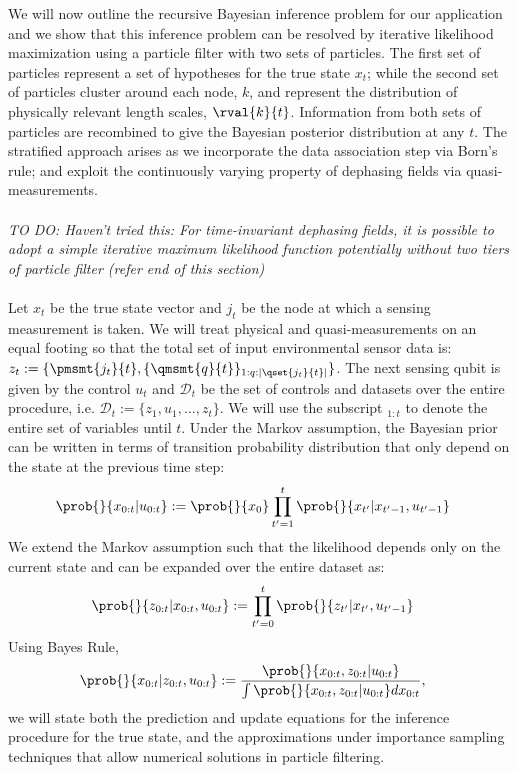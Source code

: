 We will now outline the recursive Bayesian inference problem for our application and we show that this inference problem can be resolved by iterative likelihood maximization using a particle filter with two sets of particles. The first set of particles represent a set of hypotheses for the true state $x_t$; while the second set of particles cluster around each node, $k$, and represent the distribution of physically relevant length scales, $\rval{k}{t}$. Information from both sets of particles are recombined to give the Bayesian posterior distribution at any $t$. The stratified approach arises as we incorporate the data association step via Born's rule; and exploit the continuously varying property of dephasing fields via quasi-measurements. \\
\\
\textit{TO DO: Haven't tried this: For time-invariant dephasing fields, it is possible to adopt a simple iterative maximum likelihood function potentially without two tiers of particle filter (refer end of this section)} \\
\\
Let $x_t$ be the true state vector and $j_t$ be the node at which a sensing measurement is taken. We will treat physical and quasi-measurements on an equal footing so that the total set of input environmental sensor data is: $z_t := \{\pmsmt{j_t}{t}, \{ \qmsmt{q}{t} \}_{1:q:|\qset{j_t}{t}|}\}$. The next sensing qubit is given by the control $u_t$ and $\mathcal{D}_t$ be the set of controls and datasets over the entire procedure, i.e. $\mathcal{D}_t := \{z_1, u_1, \hdots, z_t \}$.  We will use the subscript ${}_{1:t}$ to denote the entire set of variables until $t$. Under the Markov assumption, the Bayesian prior can be written in terms of transition probability distribution that only depend on the state at the previous time step:
\begin{align}
\prob{}{x_{0:t} | u_{0:t}} & := \prob{}{x_{0}} \prod_{t'=1}^{t} \prob{}{x_{t'}| x_{t'-1}, u_{t'-1}  } \label{eqn:slam:transition:1}
\end{align} We extend the Markov assumption such that the likelihood depends only on the current state and can be expanded over the entire dataset as:
\begin{align}
\prob{}{z_{0:t} | x_{0:t}, u_{0:t}} & := \prod_{t'=0}^{t} \prob{}{z_{t'} | x_{t'}, u_{t'-1} } \label{eqn:slam:likelihood:1}
\end{align}  Using Bayes Rule,
\begin{align}
\prob{}{x_{0:t} | z_{0:t} , u_{0:t}} &:= \frac{\prob{}{x_{0:t} , z_{0:t} | u_{0:t}}}{\int \prob{}{x_{0:t} , z_{0:t} | u_{0:t}} dx_{0:t}}, \label{eqn:slam:bayes:1}
\end{align} we will state both the prediction and update equations for the inference procedure for the true state, and the approximations under importance sampling techniques that allow numerical solutions  in particle filtering. \\
